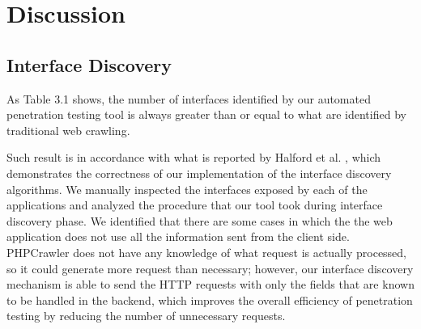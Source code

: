 \chapter{Discussion}

\section{Interface Discovery}
As Table 3.1 shows, the number of interfaces identified by our automated penetration testing tool is always greater than or equal to what are identified by traditional web crawling.

Such result is in accordance with what is reported by Halford et al. \cite{ref3}, which demonstrates the correctness of our implementation of the interface discovery algorithms. We manually inspected the interfaces exposed by each of the applications and analyzed the procedure that our tool took during interface discovery phase. We identified that there are some cases in which the the web application does not use all the information sent from the client side. PHPCrawler does not have any knowledge of what request is actually processed, so it could generate more request than necessary; however, our interface discovery mechanism is able to send the HTTP requests with only the fields that are known to be handled in the backend, which improves the overall efficiency of penetration testing by reducing the number of unnecessary requests.